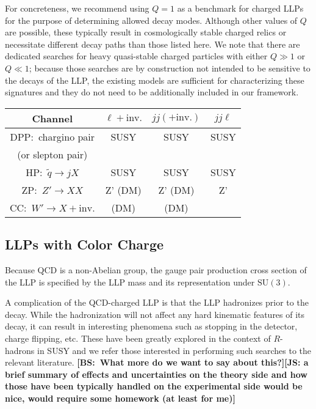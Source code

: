 For concreteness, we recommend using $Q=1$ as a benchmark for charged LLPs for the purpose of determining allowed decay modes. 
Although other values of $Q$ are possible, these typically result in cosmologically stable charged relics or necessitate different decay paths than those listed here.   
We note that there are dedicated searches for heavy quasi-stable charged particles with either $Q\gg1$ or $Q\ll1$; because those searches are by construction not intended to be sensitive to the decays of the LLP, the existing models are sufficient for characterizing these signatures and they do not need to be additionally included in our framework.

\begin{center}
\begin{tabular}{ |c|c|c|c|} 
 \hline
Channel & $\ell+\mathrm{inv.}$ &  $jj(+\mathrm{inv.})$ & $jj\ell$ \\
\hline\hline
DPP:~chargino pair & SUSY & SUSY & SUSY \\
(or slepton pair) & & &\\
\hline
HP:~$\tilde{q}\rightarrow j X$ & SUSY & SUSY & SUSY \\
\hline
ZP:~$Z'\rightarrow XX$ & Z' (DM)& Z' (DM) & Z'  \\
\hline
CC:~$W'\rightarrow X+\mathrm{inv.}$ & (DM) & (DM) & \\
\hline
\end{tabular}
\end{center}

\subsection{LLPs with Color Charge}
\label{sec:coloredLLPs}

Because QCD is a non-Abelian group, the gauge pair production cross section of the LLP is specified by the LLP mass and its representation under $\mathrm{SU}(3)$. 

A complication of the QCD-charged LLP is that the LLP hadronizes prior to the decay. While the hadronization will not affect any hard kinematic features of its decay, it can result in interesting phenomena such as stopping in the detector, charge flipping, etc. These have been greatly explored in the context of $R$-hadrons in SUSY and we refer those interested in performing such searches to the relevant literature. {\bf [BS:~What more do we want to say about this?]}{\bf [JS: a brief summary of effects and uncertainties on the theory side and how those have been typically handled on the experimental side would be nice, would require some homework (at least for me)]}


